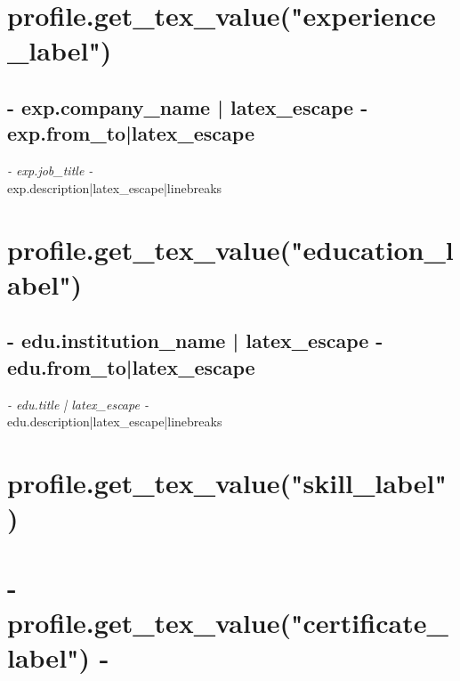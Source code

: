 \documentclass[a4paper, {{- app.cv.latex_pt -}}pt]{report}
\begin{document}
{{{{{%
\section*{ {{ profile.get_tex_value("experience_label") }} }
{%
\subsection*{ {{- exp.company_name | latex_escape -}} \hfill {{ exp.from_to|latex_escape }}  }
\textit{ {{- exp.job_title -}} } \vspace{3mm} \\
{{ exp.description|latex_escape|linebreaks }}
{%
{%

{%
\section*{ {{ profile.get_tex_value("education_label") }}}
{%
\subsection*{ {{- edu.institution_name | latex_escape -}} \hfill {{ edu.from_to|latex_escape }} }
\textit{ {{- edu.title | latex_escape -}} } \vspace{3mm} \\
{{ edu.description|latex_escape|linebreaks }}
{%
{%

{%
\section*{ {{ profile.get_tex_value("skill_label") }}}
\begin{center}
\end{center}
{%

{%
\section*{ {{- profile.get_tex_value("certificate_label") -}} }
{%

}}}}}}}}}}}}}}}}
\end{document}
